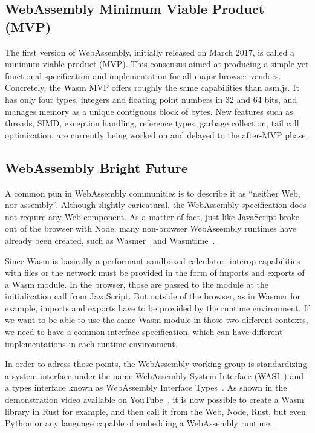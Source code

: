 \subsection{WebAssembly Minimum Viable Product (MVP)}%
\label{sub:wasm-mvp}

The first version of WebAssembly, initially released on March 2017,
is called a minimum viable product (MVP).
This consensus aimed at producing a simple yet functional specification and implementation
for all major browser vendors.
Concretely, the Wasm MVP offers roughly the same capabilities than asm.js.
It has only four types, integers and floating point numbers in 32 and 64 bits,
and manages memory as a unique contiguous block of bytes.
New features such as
threads, SIMD, exception handling, reference types, garbage collection, tail call optimization,
are currently being worked on and delayed to the after-MVP phase.

\subsection{WebAssembly Bright Future}%
\label{sub:wasm-future}

A common pun in WebAssembly communities is to describe it as ``neither Web, nor assembly''.
Although slightly caricatural, the WebAssembly specification does not require any Web component.
As a matter of fact, just like JavaScript broke out of the browser with Node,
many non-browser WebAssembly runtimes have already been created, such as Wasmer~\cite{wasmer}
and Wasmtime~\cite{wasmtime}.

Since Wasm is basically a performant sandboxed calculator,
interop capabilities with files or the network
must be provided in the form of imports and exports of a Wasm module.
In the browser, those are passed to the module at the initialization call from JavaScript.
But outside of the browser, as in Wasmer for example,
imports and exports have to be provided by the runtime environment.
If we want to be able to use the same Wasm module in those two different contexts,
we need to have a common interface specification,
which can have different implementations in each runtime environment.

In order to adress those points, the WebAssembly working group
is standardizing a system interface under the name
WebAssembly System Interface (WASI~\cite{wasi}) and a types interface
known as WebAssembly Interface Types~\cite{wait}.
As shown in the demonstration video available on YouTube~\cite{waitvideo},
it is now possible to create a Wasm library in Rust for example,
and then call it from the Web, Node, Rust, but even Python or any language
capable of embedding a WebAssembly runtime.

